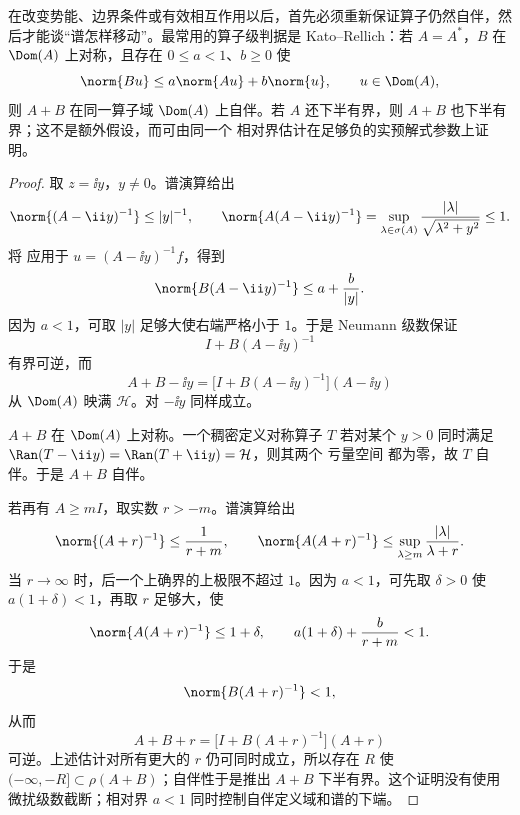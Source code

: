 \begin{theorem}
在改变势能、边界条件或有效相互作用以后，首先必须重新保证算子仍然自伴，然后才能谈“谱怎样移动”。最常用的算子级判据是 Kato--Rellich：若 $A=A^*$，$B$ 在 $\Dom(A)$ 上对称，且存在 $0\le a<1$、$b\ge0$ 使
\begin{equation}\label{eq:math-sl-kato-relative-bound}
 \norm{Bu}\le a\norm{Au}+b\norm{u},
 \qquad u\in\Dom(A),
\end{equation}
则 $A+B$ 在同一算子域 $\Dom(A)$ 上自伴。若 $A$ 还下半有界，则 $A+B$ 也下半有界；这不是额外假设，而可由同一个 相对界估计在足够负的实预解式参数上证明。\end{theorem}
\begin{proof}
取 $z=\ii y$，$y\ne0$。谱演算给出
\[
 \norm{(A-\ii y)^{-1}}\le |y|^{-1},
 \qquad
 \norm{A(A-\ii y)^{-1}}
 =\sup_{\lambda\in\sigma(A)}\frac{|\lambda|}{\sqrt{\lambda^2+y^2}}
 \le1.
\]
将 应用于 $u=(A-\ii y)^{-1}f$，得到
\[
 \norm{B(A-\ii y)^{-1}}
 \le a+\frac{b}{|y|}.
\]
因为 $a<1$，可取 $|y|$ 足够大使右端严格小于 $1$。于是 Neumann 级数保证
\[
 I+B(A-\ii y)^{-1}
\]
有界可逆，而
\[
 A+B-\ii y
 =\bigl[I+B(A-\ii y)^{-1}\bigr](A-\ii y)
\]
从 $\Dom(A)$ 映满 $\mathcal H$。对 $-\ii y$ 同样成立。

$A+B$ 在 $\Dom(A)$ 上对称。一个稠密定义对称算子 $T$ 若对某个 $y>0$ 同时满足
$\Ran(T-\ii y)=\Ran(T+\ii y)=\mathcal H$，则其两个 亏量空间 都为零，故 $T$ 自伴。于是 $A+B$ 自伴。

若再有 $A\ge mI$，取实数 $r>-m$。谱演算给出
\[
 \norm{(A+r)^{-1}}\le\frac1{r+m},
 \qquad
 \norm{A(A+r)^{-1}}
 \le\sup_{\lambda\ge m}\frac{|\lambda|}{\lambda+r}.
\]
当 $r\to\infty$ 时，后一个上确界的上极限不超过 $1$。因为 $a<1$，可先取 $\delta>0$ 使 $a(1+\delta)<1$，再取 $r$ 足够大，使
\[
 \norm{A(A+r)^{-1}}\le1+\delta,
 \qquad
 a(1+\delta)+\frac b{r+m}<1.
\]
于是
\[
 \norm{B(A+r)^{-1}}<1,
\]
从而
\[
 A+B+r
 =\bigl[I+B(A+r)^{-1}\bigr](A+r)
\]
可逆。上述估计对所有更大的 $r$ 仍可同时成立，所以存在 $R$ 使
$(-\infty,-R]\subset\rho(A+B)$；自伴性于是推出 $A+B$ 下半有界。这个证明没有使用微扰级数截断；相对界 $a<1$ 同时控制自伴定义域和谱的下端。\end{proof}

